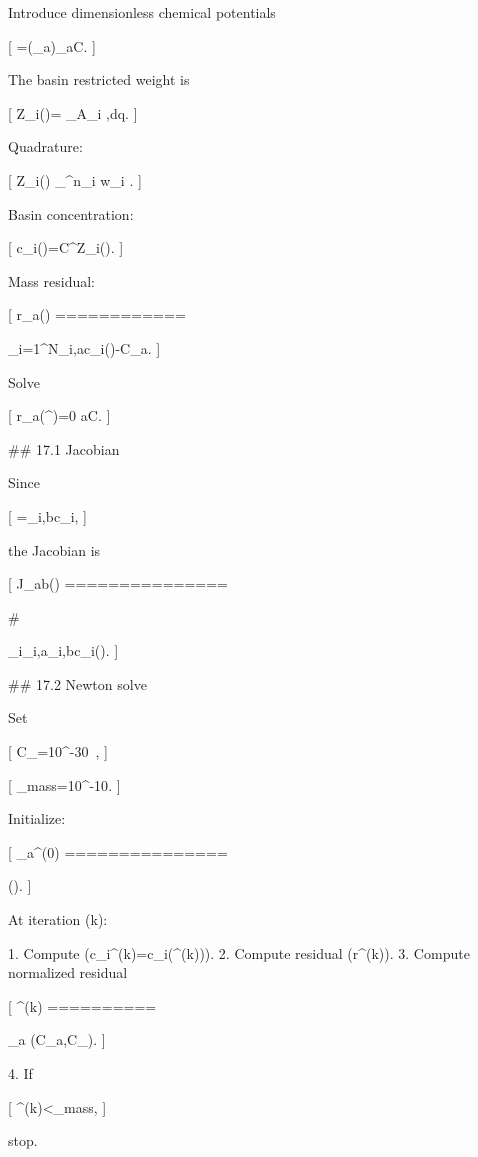 Introduce dimensionless chemical potentials

[
\lambda=(\lambda_a)_{a\in\mathcal C}.
]

The basin restricted weight is

[
Z_i(\lambda)=
\int_{A_i}
\exp{},\mathrm dq.
]

Quadrature:

[
Z_i(\lambda)
\approx
\sum_{}^{n_i}
w_{i\ell}
\exp{}.
]

Basin concentration:

[
c_i(\lambda)=C^\circ Z_i(\lambda).
]

Mass residual:

[
r_a(\lambda)
============

\sum_{i=1}^N\nu_{i,a}c_i(\lambda)-C_a.
]

Solve

[
r_a(\lambda^\star)=0
\qquad
\forall a\in\mathcal C.
]

## 17.1 Jacobian

Since

[
=\nu_{i,b}c_i,
]

the Jacobian is

[
J_{ab}(\lambda)
===============

# 

\sum_i\nu_{i,a}\nu_{i,b}c_i(\lambda).
]

## 17.2 Newton solve

Set

[
C_{\min}=10^{-30}\ ,
]

[
\tau_{\rm mass}=10^{-10}.
]

Initialize:

[
\lambda_a^{(0)}
===============

\log\left(\right).
]

At iteration (k):

1. Compute (c_i^{(k)}=c_i(\lambda^{(k)})).
2. Compute residual (r^{(k)}).
3. Compute normalized residual

[
\eta^{(k)}
==========

\max_a
{\max(C_a,C_{\min})}.
]

4. If

[
\eta^{(k)}<\tau_{\rm mass},
]

stop.

